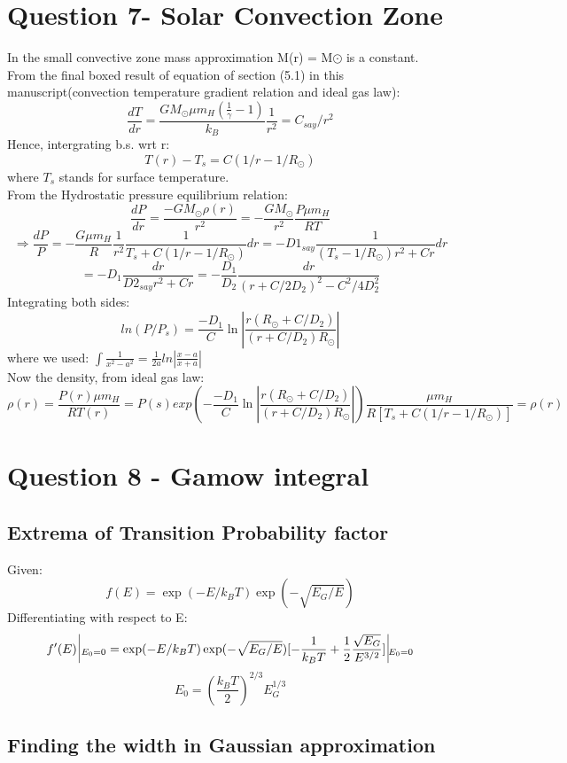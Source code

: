 \documentclass[11pt]{article}
\begin{document}
	\section{\color{teal} Question 7- Solar Convection Zone}

	In the small convective zone mass approximation M(r) = M$\odot$ is a constant.\\
	From the final boxed result of equation of section (5.1) in this manuscript(convection temperature gradient relation and ideal gas law):
	\[
		\frac{dT}{dr} = \frac{GM_\odot\mu m_H(\frac{1}{\gamma}-1)}{k_B} \frac{1}{r^2} = C_{say} /r^2
	\]
	Hence, intergrating b.s. wrt r:
	\[
		\boxed{T(r) - T_s = C (1/r - 1/R_\odot)}
	\]
	where $T_s$ stands for surface temperature.\\
	From the Hydrostatic pressure equilibrium relation:
	\[
		\frac{dP}{dr} = \frac{-GM_\odot \rho(r)}{r^2} = -\frac{G M_\odot}{r^2} \frac{P\mu m_H}{RT}
	\]
	\[
		\Rightarrow \frac{dP}{P} = - \frac{G\mu m_H}{R}\frac{1}{r^2}\frac{1}{T_s + C(1/r - 1/R_\odot)}dr  =-D1_{say}\frac{1}{(T_s-1/R_\odot)r^2 +Cr}dr 
	\]
	\[
		= -D_1\frac{dr}{D2_{say}r^2+Cr} = -\frac{D_1}{D_2}\frac{dr}{(r + C/2D_2)^2-C^2/4D_2^2}
	\]
	Integrating both sides:
	\[
		\boxed{ln(P/P_s) = \frac{-D_1}{C}\ln|\frac{r(R_\odot+C/D_2)}{(r+C/D_2)R_\odot}|}
	\]
	where we used:
	\(
	 	\int \frac{1}{x^2-a^2} = \frac{1}{2a}ln|\frac{x-a}{x+a}|
	\)\\
	Now the density, from ideal gas law:
	\[
		\rho(r)  = \frac{P(r)\mu m_H}{RT(r)} = \boxed{P(s)exp(-\frac{-D_1}{C}\ln|\frac{r(R_\odot+C/D_2)}{(r+C/D_2)R_\odot}|)\frac{\mu m_H}{R[T_s + C(1/r-1/R_\odot)]}=\rho(r)}
	\]
	
	\section{\color{teal}Question 8 - Gamow integral}
	
	\subsection{Extrema of Transition Probability factor}
	
	Given:
	\[
		f(E) = \exp(-E/k_BT)\exp(-\sqrt{E_G/E})
	\]
	Differentiating with respect to E:
	\[
		f'(E)\, \vline_{\, E_0 = 0} = \exp(-E/k_BT)\exp(-\sqrt{E_G/E})[-\frac{1}{k_BT} +\frac{1}{2}\frac{\sqrt{E_G}}{E^{3/2}}] \, \vline_{E_0=0}
	\]
	\[
		\boxed{E_0 = (\frac{k_BT}{2})^{2/3}E_G^{1/3}}
	\]
	\subsection{Finding the width in Gaussian approximation}
	
\end{document}

